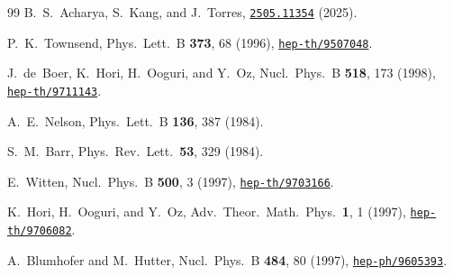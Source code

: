 \documentclass[12pt,a4paper]{article}
\begin{document}
\begin{thebibliography}{99}
  B.~S.~Acharya, S.~Kang, and J.~Torres,
  \href{https://arxiv.org/abs/2505.11354}{\texttt{2505.11354}} (2025).

  P.~K.~Townsend,
  Phys.\ Lett.\ B \textbf{373}, 68 (1996),
  \href{https://arxiv.org/abs/hep-th/9507048}{\texttt{hep-th/9507048}}.

  J.~de~Boer, K.~Hori, H.~Ooguri, and Y.~Oz,
  Nucl.\ Phys.\ B \textbf{518}, 173 (1998),
  \href{https://arxiv.org/abs/hep-th/9711143}{\texttt{hep-th/9711143}}.

  A.~E.~Nelson,
  Phys.\ Lett.\ B \textbf{136}, 387 (1984).

  S.~M.~Barr,
  Phys.\ Rev.\ Lett.\ \textbf{53}, 329 (1984).

  E.~Witten,
  Nucl.\ Phys.\ B \textbf{500}, 3 (1997),
  \href{https://arxiv.org/abs/hep-th/9703166}{\texttt{hep-th/9703166}}.

  K.~Hori, H.~Ooguri, and Y.~Oz,
  Adv.\ Theor.\ Math.\ Phys.\ \textbf{1}, 1 (1997),
  \href{https://arxiv.org/abs/hep-th/9706082}{\texttt{hep-th/9706082}}.

  A.~Blumhofer and M.~Hutter,
  Nucl.\ Phys.\ B \textbf{484}, 80 (1997),
  \href{https://arxiv.org/abs/hep-ph/9605393}{\texttt{hep-ph/9605393}}.

\end{thebibliography}
\end{document}
